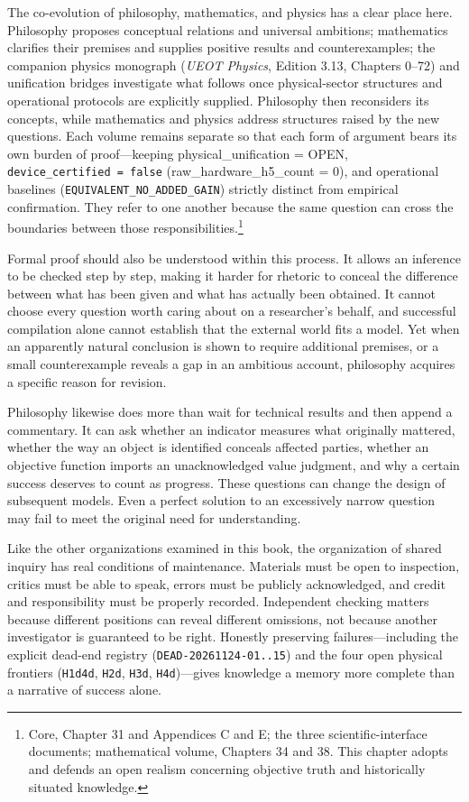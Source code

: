 \documentclass[
  english,
  11pt,
  oneside]{book}
\begin{document}
The co-evolution of philosophy, mathematics, and physics has a clear place here. Philosophy proposes conceptual relations and universal ambitions; mathematics clarifies their premises and supplies positive results and counterexamples; the companion physics monograph (\emph{UEOT Physics}, Edition 3.13, Chapters 0--72) and unification bridges investigate what follows once physical-sector structures and operational protocols are explicitly supplied. Philosophy then reconsiders its concepts, while mathematics and physics address structures raised by the new questions. Each volume remains separate so that each form of argument bears its own burden of proof---keeping physical\_unification = OPEN, \texttt{device\_certified\ =\ false} (raw\_hardware\_h5\_count = 0), and operational baselines (\texttt{EQUIVALENT\_NO\_ADDED\_GAIN}) strictly distinct from empirical confirmation. They refer to one another because the same question can cross the boundaries between those responsibilities.\footnote{\hypertarget{ph-note-67}{}Core, Chapter 31 and Appendices C and E; the three scientific-interface documents; mathematical volume, Chapters 34 and 38. This chapter adopts and defends an open realism concerning objective truth and historically situated knowledge.}

Formal proof should also be understood within this process. It allows an inference to be checked step by step, making it harder for rhetoric to conceal the difference between what has been given and what has actually been obtained. It cannot choose every question worth caring about on a researcher's behalf, and successful compilation alone cannot establish that the external world fits a model. Yet when an apparently natural conclusion is shown to require additional premises, or a small counterexample reveals a gap in an ambitious account, philosophy acquires a specific reason for revision.

Philosophy likewise does more than wait for technical results and then append a commentary. It can ask whether an indicator measures what originally mattered, whether the way an object is identified conceals affected parties, whether an objective function imports an unacknowledged value judgment, and why a certain success deserves to count as progress. These questions can change the design of subsequent models. Even a perfect solution to an excessively narrow question may fail to meet the original need for understanding.

Like the other organizations examined in this book, the organization of shared inquiry has real conditions of maintenance. Materials must be open to inspection, critics must be able to speak, errors must be publicly acknowledged, and credit and responsibility must be properly recorded. Independent checking matters because different positions can reveal different omissions, not because another investigator is guaranteed to be right. Honestly preserving failures---including the explicit dead-end registry (\texttt{DEAD-20261124-01..15}) and the four open physical frontiers (\texttt{H1d4d}, \texttt{H2d}, \texttt{H3d}, \texttt{H4d})---gives knowledge a memory more complete than a narrative of success alone.
\end{document}

